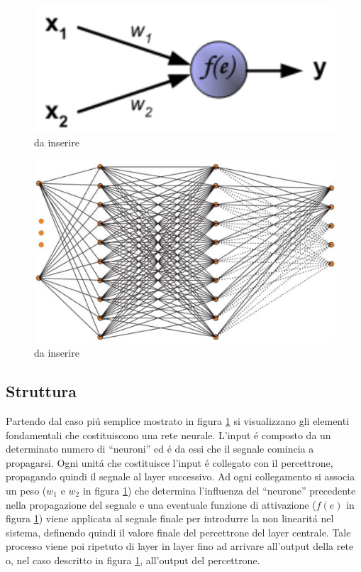 \documentclass[a4paper,10pt]{article}
\begin{document}
 \begin{figure}[h!]
  \centering
  \includegraphics[scale=0.2]{perceptron.png}
  \caption{da inserire}
  \label{perceptronpng}
 \end{figure}
 
 \begin{figure}[h!]
  \centering
  \includegraphics[scale=0.3]{NeuralNetwork.png}
  \caption{da inserire}
  \label{NeuralNetworkpng}
 \end{figure}

 \subsection{Struttura} 
 Partendo dal caso pi\'u semplice mostrato in figura \ref{perceptronpng} si visualizzano gli elementi fondamentali che costituiscono una rete neurale. 
 L'input \'e composto da un determinato numero di ``neuroni'' ed \'e da essi che il segnale comincia a propagarsi. Ogni unit\'a che costituisce l'input \'e collegato con il percettrone, propagando quindi il segnale al layer successivo. Ad ogni collegamento si associa un peso ($w_1$ e $w_2$ in figura \ref{perceptronpng}) che determina l'influenza del ``neurone'' precedente nella propagazione del segnale e una eventuale funzione di attivazione ($f(e)$ in figura \ref{perceptronpng}) viene applicata al segnale finale per introdurre la non linearit\'a nel sistema, definendo quindi il valore finale del percettrone del layer centrale. Tale processo viene poi ripetuto di layer in layer fino ad arrivare all'output della rete o, nel caso descritto in figura \ref{perceptronpng}, all'output del percettrone.
  
\end{document}
